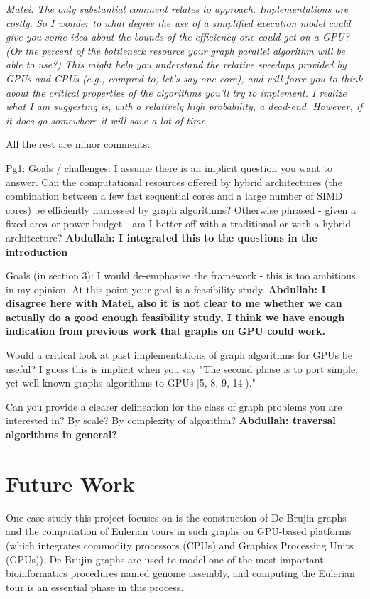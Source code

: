 \documentclass{acm_proc_article-sp}[12pt]
\begin{document}
{\em Matei: The only substantial comment relates to approach.  Implementations are costly. So I wonder to what degree the use of a simplified execution model could give you some idea about the bounds of the efficiency one could get on a GPU?   (Or the percent of the bottleneck resource your graph parallel algorithm will be able to use?)  This might help you understand the relative speedups provided by GPUs and CPUs (e.g., compred to, let's say one core), and will force you to think about the critical properties of the algorithms you'll try to implement.   I realize what I am suggesting is, with a relatively high probability, a dead-end.  However, if it does go somewhere it will save a lot of  time.
 
All the rest are minor comments:
 
Pg1: Goals / challenges: I assume there is an implicit question you want to answer.  Can the computational resources offered by hybrid architectures (the combination between a few fast sequential cores and a large number of SIMD cores) be efficiently harnessed by graph algorithms? Otherwise phrased - given a fixed area or power budget - am I better off with a traditional or with a hybrid architecture? \textbf{Abdullah: I integrated this to the questions in the introduction}
 
Goals (in section 3): I would de-emphasize the framework - this is too ambitious in my opinion. At this point your goal is a feasibility study. \textbf{Abdullah: I disagree here with Matei, also it is not clear to me whether we can actually do a good enough feasibility study, I think we have enough indication from previous work that graphs on GPU could work.}
 
Would a critical look at past implementations of graph algorithms for GPUs be useful?  I guess this is implicit when you say "The second phase is to port simple, yet well known graphs algorithms to GPUs [5, 8, 9, 14])."
 
Can you provide a clearer delineation for the class of graph problems you are interested in? By scale? By complexity of algorithm? \textbf{Abdullah: traversal algorithms in general?}
}

\section{Future Work}
\label{sec:future}
One case study this project focuses on is the construction of De Brujin graphs and the computation of Eulerian tours in such graphs on GPU-based platforms (which integrates commodity processors (CPUs) and Graphics Processing Units (GPUs)). De Brujin graphs are used to model one of the most important bioinformatics procedures named genome assembly, and computing the Eulerian tour is an essential phase in this process.
\end{document}
